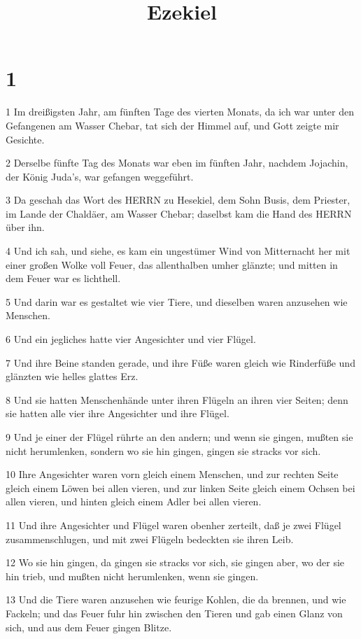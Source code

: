 

\title{Ezekiel}


\chapter{1}

\par 1 Im dreißigsten Jahr, am fünften Tage des vierten Monats, da ich war unter den Gefangenen am Wasser Chebar, tat sich der Himmel auf, und Gott zeigte mir Gesichte.
\par 2 Derselbe fünfte Tag des Monats war eben im fünften Jahr, nachdem Jojachin, der König Juda's, war gefangen weggeführt.
\par 3 Da geschah das Wort des HERRN zu Hesekiel, dem Sohn Busis, dem Priester, im Lande der Chaldäer, am Wasser Chebar; daselbst kam die Hand des HERRN über ihn.
\par 4 Und ich sah, und siehe, es kam ein ungestümer Wind von Mitternacht her mit einer großen Wolke voll Feuer, das allenthalben umher glänzte; und mitten in dem Feuer war es lichthell.
\par 5 Und darin war es gestaltet wie vier Tiere, und dieselben waren anzusehen wie Menschen.
\par 6 Und ein jegliches hatte vier Angesichter und vier Flügel.
\par 7 Und ihre Beine standen gerade, und ihre Füße waren gleich wie Rinderfüße und glänzten wie helles glattes Erz.
\par 8 Und sie hatten Menschenhände unter ihren Flügeln an ihren vier Seiten; denn sie hatten alle vier ihre Angesichter und ihre Flügel.
\par 9 Und je einer der Flügel rührte an den andern; und wenn sie gingen, mußten sie nicht herumlenken, sondern wo sie hin gingen, gingen sie stracks vor sich.
\par 10 Ihre Angesichter waren vorn gleich einem Menschen, und zur rechten Seite gleich einem Löwen bei allen vieren, und zur linken Seite gleich einem Ochsen bei allen vieren, und hinten gleich einem Adler bei allen vieren.
\par 11 Und ihre Angesichter und Flügel waren obenher zerteilt, daß je zwei Flügel zusammenschlugen, und mit zwei Flügeln bedeckten sie ihren Leib.
\par 12 Wo sie hin gingen, da gingen sie stracks vor sich, sie gingen aber, wo der sie hin trieb, und mußten nicht herumlenken, wenn sie gingen.
\par 13 Und die Tiere waren anzusehen wie feurige Kohlen, die da brennen, und wie Fackeln; und das Feuer fuhr hin zwischen den Tieren und gab einen Glanz von sich, und aus dem Feuer gingen Blitze.
